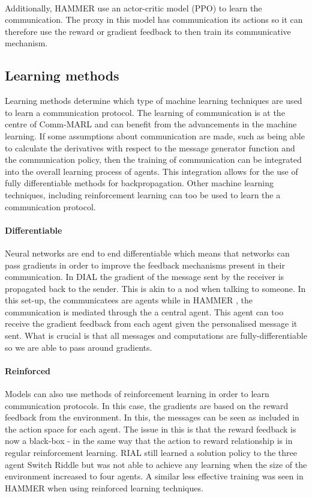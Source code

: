 \documentclass{article}
\begin{document}
\

Additionally, HAMMER \citep{gupta2022HAMMER} use an actor-critic model (PPO) to learn the communication. The proxy in this model has communication its actions so it can therefore use the reward or gradient feedback to then train its communicative mechanism.

\subsection{Learning methods}\label{sec:learning_methods}

Learning methods determine which type of machine learning techniques are used to learn a communication protocol. The learning of communication is at the centre of Comm-MARL and can benefit from the advancements in the machine learning. If some assumptions about communication are made, such as being able to calculate the derivatives with respect to the message generator function and the communication policy, then the training of communication can be integrated into the overall learning process of agents. This integration allows for the use of fully differentiable methods for backpropagation. Other machine learning techniques, including reinforcement learning can too be used to learn the a communication protocol. 

\paragraph{Differentiable} Neural networks are end to end differentiable which means that networks can pass gradients in order to improve the feedback mechanisms present in their communication. In DIAL \citep{foerster2016learning} the gradient of the message sent by the receiver is propagated back to the sender. This is akin to a nod when talking to someone. In this set-up, the communicatees are agents while in HAMMER \citep{gupta2022HAMMER}, the communication is mediated through the a central agent. This agent can too receive the gradient feedback from each agent given the personalised message it sent. What is crucial is that all messages and computations are fully-differentiable so we are able to pass around gradients.

\paragraph{Reinforced} Models can also use methods of reinforcement learning in order to learn communication protocols. In this case, the gradients are based on the reward feedback from the environment. In this, the messages can be seen as included in the action space for each agent. The issue in this is that the reward feedback is now a black-box - in the same way that the action to reward relationship is in regular reinforcement learning. RIAL \citep{foerster2016learning} still learned a solution policy to the three agent Switch Riddle but was not able to achieve any learning when the size of the environment increased to four agents. A similar less effective training was seen in HAMMER \citep{gupta2022HAMMER} when using reinforced learning techniques.
\end{document}
